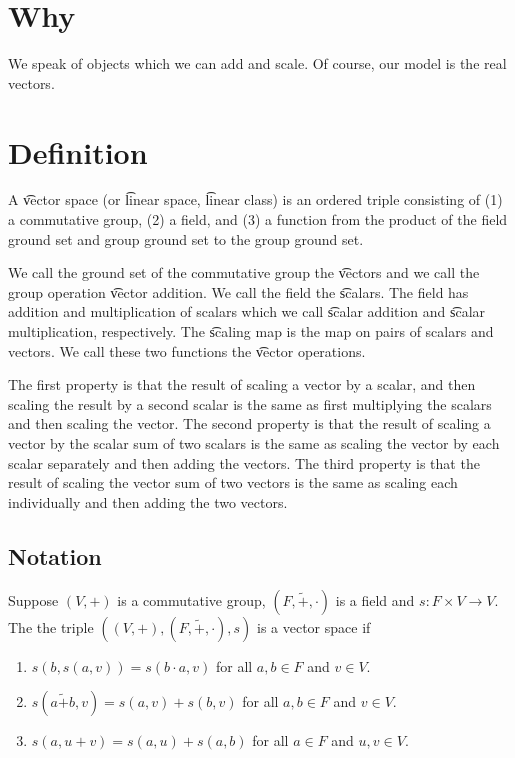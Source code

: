 
\section*{Why}

We speak of objects which we can add and scale.
Of course, our model is the real vectors.

\section*{Definition}

A \t{vector space} (or \t{linear space}, \t{linear class}) is an ordered triple consisting of (1) a commutative group, (2) a field, and (3) a function from the product of the field ground set and group ground set to the group ground set.

We call the ground set of the commutative group the \t{vectors} and we call the group operation \t{vector addition}.
We call the field the \t{scalars}.
The field has addition and multiplication of scalars which we call \t{scalar addition} and \t{scalar multiplication}, respectively.
The \t{scaling map} is the map on pairs of scalars and vectors.
We call these two functions the \t{vector operations}.

The first property is that the result of scaling a vector by a scalar, and then scaling the result by a second scalar is the same as first multiplying the scalars and then scaling the vector.
The second property is that the result of scaling a vector by the scalar sum of two scalars is the same as scaling the vector by each scalar separately and then adding the vectors.
The third property is that the result of scaling the vector sum of two vectors is the same as scaling each individually and then adding the two vectors.

\subsection*{Notation}

Suppose $(V, +)$ is a commutative group, $(F, \tilde{+}, \cdot )$ is a field and $s: F \times  V \to V$.
The the triple $((V, +), (F, \tilde{+}, \cdot ), s)$ is a vector space if
  \begin{enumerate}
    \item $s(b,s(a, v)) = s(b \cdot  a, v)$ for all $a, b \in F$ and $v \in V$.
    \item $s(a\tilde{+}b, v) = s(a, v) + s(b, v)$ for all $a, b \in F$ and $v \in V$.
    \item $s(a, u + v) = s(a,u) + s(a, b)$ for all $a \in F$ and $u, v \in V$.
  \end{enumerate}

